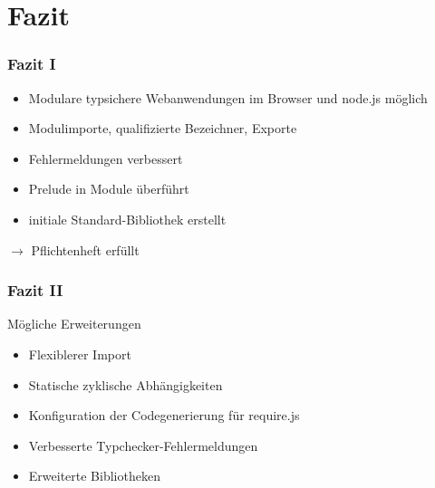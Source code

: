 \section{Fazit}

\begin{frame}
\frametitle{Fazit I}
\begin{itemize}
\item Modulare typsichere Webanwendungen im Browser und node.js möglich
\item Modulimporte, qualifizierte Bezeichner, Exporte
\item Fehlermeldungen verbessert
\item Prelude in Module überführt
\item initiale Standard-Bibliothek erstellt
\end{itemize}

$\rightarrow$ Pflichtenheft erfüllt
\end{frame}

\begin{frame}
\frametitle{Fazit II}
Mögliche Erweiterungen

\begin{itemize}
\item Flexiblerer Import
\item Statische zyklische Abhängigkeiten
\item Konfiguration der Codegenerierung für require.js
\item Verbesserte Typchecker-Fehlermeldungen
\item Erweiterte Bibliotheken
\end{itemize}
\end{frame}